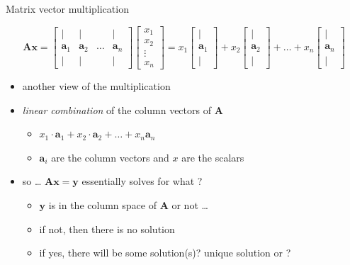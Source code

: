 \documentclass{scrartcl}
\def\tightlist{}
\newcommand{\vv}[1]{\boldsymbol{#1}}
\begin{document}
\begin{frame}{Matrix vector multiplication}
\protect\hypertarget{matrix-vector-multiplication}{}


\[\vv{A}\vv{x} = \begin{bmatrix}
\vert & \vert &  & \vert\\
\vv{a}_1 & \vv{a}_2 & \ldots & \vv{a}_{n} \\
\vert & \vert & & \vert 
\end{bmatrix} \begin{bmatrix}
x_{1}\\
x_{2}  \\
\vdots  \\
x_{n} 
\end{bmatrix} =  x_1 \begin{bmatrix}
\vert \\
\vv{a}_{1}  \\
\vert 
\end{bmatrix} + x_2 \begin{bmatrix}
\vert \\
\vv{a}_{2}  \\
\vert 
\end{bmatrix}+\ldots + x_n \begin{bmatrix}
\vert \\
\vv{a}_{n}  \\
\vert 
\end{bmatrix}\]

\begin{itemize}
\tightlist
\item
  another view of the multiplication
\item
  \emph{linear combination} of the column vectors of \(\vv{A}\)

  \begin{itemize}
  \tightlist
  \item
    \(x_1\cdot \vv{a}_1 + x_2 \cdot \vv{a}_2+\ldots + x_n\vv{a}_n\)
  \item
    \(\vv{a}_{i}\) are the column vectors and \(x\) are the scalars
  \end{itemize}
\item
  so \ldots{} \(\vv{Ax} = \vv{y}\) essentially solves for what ? \pause 

  \begin{itemize}
  \tightlist
  \item
    \(\vv{y}\) is in the column space of \(\vv{A}\) or not \ldots{}
  \item
    if not, then there is no solution
  \item
    if yes, there will be some solution(s)? unique solution or ?
  \end{itemize}
\end{itemize}

\end{frame}
\end{document}
